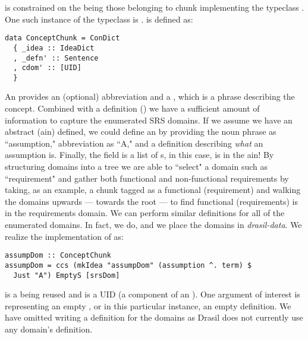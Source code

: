  is constrained on the \haskell{[UID]} being those belonging to chunk implementing the typeclass . One such instance of the  typeclass is .  is defined as:

\begin{tcolorbox}
\begin{verbatim}
data ConceptChunk = ConDict
  { _idea :: IdeaDict
  , _defn' :: Sentence
  , cdom' :: [UID]
  }
\end{verbatim}
\end{tcolorbox}

An  provides an (optional) abbreviation and a , which is a phrase describing the concept. Combined with a definition () we have a sufficient amount of information to capture the enumerated SRS domains. If we assume we have an abstract (ain) defined, we could define an  by providing the noun phrase as ``assumption," abbreviation as ``A," and a definition describing \textit{what} an assumption is. Finally, the  field is a list of  s, in this case,  is in the ain! By structuring domains into a tree we are able to ``select" a domain such as ``requirement" and gather both functional and non-functional requirements by taking, as an example, a chunk tagged as a functional (requirement) and walking the domains upwards --- towards the root --- to find functional (requirements) is in the requirements domain. We can perform similar definitions for all of the enumerated domains. In fact, we do, and we place the domains in \textit{drasil-data}. We realize the implementation of  as:

\begin{tcolorbox}
\begin{verbatim}
assumpDom :: ConceptChunk
assumpDom = ccs (mkIdea "assumpDom" (assumption ^. term) $
  Just "A") EmptyS [srsDom]
\end{verbatim}
\end{tcolorbox}

 is a  being reused and  is a UID (a component of an ). One argument of interest is  representing an empty , or in this particular instance, an empty definition. We have omitted writing a definition for the domains as Drasil does not currently use any domain's definition.

